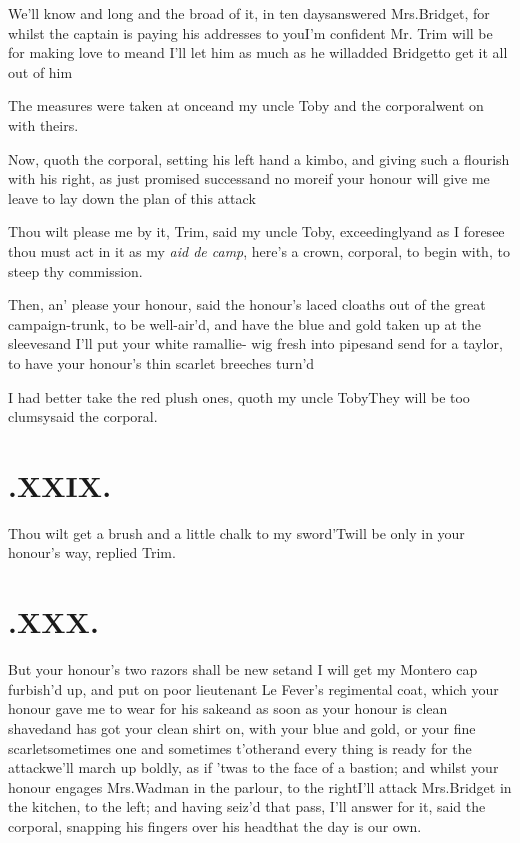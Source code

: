 \documentclass{article}
\begin{document}
\tsk We’ll know and long and the broad of it, in ten
days\tsk answered Mrs.\@ Bridget, for whilst the captain is
paying his addresses to you\tsk I’m confident Mr.
Trim will be for making love to me\tsk and I’ll let
him as much as he will\tsk added\break
Bridget\tsk to get it
all out of him\tsh

The measures were taken at once\tsh\break and my uncle
Toby and the corporal\break went on with theirs.\etp{}

Now, quoth the corporal, setting his left hand a kimbo, and
giving such a flourish with his right, as just promised
success\tsk and no more\tsh if your honour will give me
leave to lay down the plan of this attack\tsh

\tsh Thou wilt please me by it, Trim, said my
uncle Toby, exceedingly\tsk and as I foresee thou must act
in it as my \textit{aid de camp}, here’s a crown, corporal, to
begin with, to steep thy commission.

Then, an’ please your honour, said the\break
{}\break
{}\break
honour’s laced cloaths out of the great campaign-trunk, to be
well-air’d, and have the blue and gold taken up at the
sleeves\tsk and I’ll put your white ramallie-
wig fresh into
pipes\tsk and send for a taylor, to have your honour’s thin
scarlet breeches turn’d\tsh

\tsh I had better take the red plush ones,\break
quoth my uncle Toby\tsk They will be\break
too clumsy\tsk said the corporal.

\section{.\enspace XXIX.}

\quad\tsh Thou wilt get a brush and a little chalk to my
sword\tsh ’Twill be only in your honour’s way,
replied Trim.

\section{.\enspace XXX.}

\quad\tsk But your honour’s two razors shall be new
set\tsk and I will get my Montero cap furbish’d up,
and put on poor lieutenant Le Fever’s regimental coat,
which your honour gave me to
wear for his sake\tsk and as soon as your honour is clean
shaved\tsk and has got your clean shirt on, with your blue and
gold, or your fine scarlet\tsh sometimes one and sometimes
t’other\tsk and every thing is ready for the attack\tsk we’ll
march up boldly, as if ’twas to the face of a bastion; and
whilst your honour engages Mrs.\@  Wadman in the parlour, to the
right\tsh I’ll attack Mrs.\@ Bridget in the kitchen, to the
left; and having seiz’d that pass, I’ll answer for it, said the
corporal, snapping his fingers over his head\break\tsk that the
day is our own.
\end{document}

